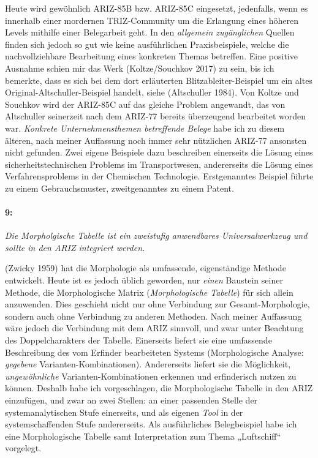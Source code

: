 \documentclass[12pt,a4paper]{article}
\newcommand{\these}[2]{\paragraph{#1:} \emph{#2}\par}
\begin{document}
Heute wird gewöhnlich ARIZ-85B bzw. ARIZ-85C eingesetzt, jedenfalls, wenn es
innerhalb einer mordernen TRIZ-Community um die Erlangung eines höheren Levels
mithilfe einer Belegarbeit geht. In den \emph{allgemein zugänglichen} Quellen
finden sich jedoch so gut wie keine ausführlichen Praxisbeispiele, welche die
nachvollziehbare Bearbeitung eines konkreten Themas betreffen. Eine positive
Ausnahme schien mir das Werk (Koltze/Souchkov 2017) zu sein, bis ich bemerkte,
dass es sich bei dem dort erläuterten Blitzableiter-Beispiel um ein altes
Original-Altschuller-Beispiel handelt, siehe (Altschuller 1984). Von Koltze
und Souchkov wird der ARIZ-85C auf das gleiche Problem angewandt, das von
Altschuller seinerzeit nach dem ARIZ-77 bereits überzeugend bearbeitet worden
war. \emph{Konkrete Unternehmensthemen betreffende Belege} habe ich zu diesem
älteren, nach meiner Auffassung noch immer sehr nützlichen ARIZ-77 ansonsten
nicht gefunden. Zwei eigene Beispiele dazu beschreiben einerseits die Lösung
eines sicherheitstechnischen Problems im Transportwesen, andererseits die
Lösung eines Verfahrensproblems in der Chemischen Technologie. Erstgenanntes
Beispiel führte zu einem Gebrauchsmuster, zweitgenanntes zu einem Patent.

\these{9}{Die Morpholgische Tabelle ist ein zweistufig anwendbares
  Universalwerkzeug und sollte in den ARIZ integriert werden.}

(Zwicky 1959) hat die Morphologie als umfassende, eigenständige Methode
entwickelt.  Heute ist es jedoch üblich geworden, nur \emph{einen} Baustein
seiner Methode, die Morphologische Matrix (\emph{Morphologische Tabelle}) für
sich allein anzuwenden.  Dies geschieht nicht nur ohne Verbindung zur
Gesamt-Morphologie, sondern auch ohne Verbindung zu anderen Methoden. Nach
meiner Auffassung wäre jedoch die Verbindung mit dem ARIZ sinnvoll, und zwar
unter Beachtung des Doppelcharakters der Tabelle. Einerseits liefert sie eine
umfassende Beschreibung des vom Erfinder bearbeiteten Systems (Morphologische
Analyse: \emph{gegebene} Varianten-Kombinationen). Andererseits liefert sie
die Möglichkeit, \emph{ungewöhnliche} Varianten-Kombinationen erkennen und
erfinderisch nutzen zu können. Deshalb habe ich vorgeschlagen, die
Morphologische Tabelle in den ARIZ einzufügen, und zwar an zwei Stellen: an
einer passenden Stelle der systemanalytischen Stufe einerseits, und als
eigenen \emph{Tool} in der systemschaffenden Stufe andererseits. Als
ausführliches Belegbeispiel habe ich eine Morphologische Tabelle samt
Interpretation zum Thema „Luftschiff“ vorgelegt.
\end{document}
